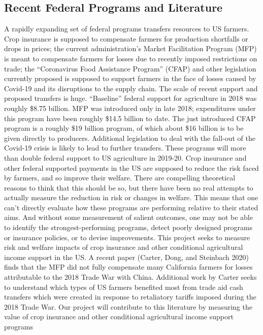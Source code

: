 \documentclass{article}
\begin{document}
\subsection*{Recent Federal Programs and Literature}
A rapidly expanding set of federal programs transfers resources to US farmers.
Crop insurance is supposed to compensate farmers for production shortfalls or drops
in prices; the current administration's Market Facilitation Program (MFP) is meant
to compensate farmers for losses due to recently imposed restrictions on trade; the
“Coronavirus Food Assistance Program” (CFAP) and other legislation currently proposed
is supposed to support farmers in the face of losses caused by Covid-19 and its
disruptions to the supply chain.
The scale of recent support and proposed transfers is huge. “Baseline” federal
support for agriculture in 2018 was roughly \$8.75 billion. MFP was introduced only
in late 2018; expenditures under this program have been roughly \$14.5 billion to
date. The just introduced CFAP program is a roughly \$19 billion program, of which
about \$16 billion is to be given directly to producers. Additional legislation to deal
with the fall-out of the Covid-19 crisis is likely to lead to further transfers. These
programs will more than double federal support to US agriculture in 2019-20.
Crop insurance and other federal supported payments in the US are supposed to
reduce the risk faced by farmers, and so improve their welfare. There are compelling
theoretical reasons to think that this should be so, but there have been no real
attempts to actually measure the reduction in risk or changes in welfare. This means
that one can't directly evaluate how these programs are performing relative to their
stated aims. And without some measurement of salient outcomes, one may not be
able to identify the strongest-performing programs, detect poorly designed programs
or insurance policies, or to devise improvements.
This project seeks to measure risk and welfare impacts of crop insurance and other
conditional agricultural income support in the US. A recent paper (Carter, Dong,
and Steinbach 2020) finds that the MFP did not fully compensate many California
farmers for losses attributable to the 2018 Trade War with China. Additional work
by Carter seeks to understand which types of US farmers benefited most from trade
aid cash transfers which were created in response to retaliatory tariffs imposed during
the 2018 Trade War. Our project will contribute to this literature by measuring the
value of crop insurance and other conditional agricultural income support programs
\end{document}
